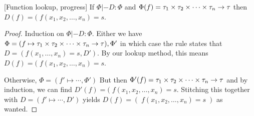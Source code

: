 \documentclass[a4paper, oneside, 10pt, final]{memoir}
\begin{document}
\begin{lem}{[Function lookup, progress]}
  \label{lem:phi-lookup-good}
  If $\Phi |- D : \Phi$ and $\Phi(f) = \tau_1 \times \tau_2 \times \dotsb \times \tau_n -> \tau$ then $D(f) = (\; f(x_1,
  x_2, \dotsc, x_n) = s$.
\end{lem}
\begin{proof}
  Induction on $\Phi |- D : \Phi$. Either we have $\Phi = (f \mapsto
  \tau_1 \times \tau_2 \times \dotsb \times \tau_n -> \tau),\Phi'$ in which case the rule states that $D = (f(x_1,
  \dotsc, x_n) = s, D')$. By our lookup method, this means $D(f) = (\; f(x_1,
  x_2, \dotsc, x_n) = s$.

  Otherwise, $\Phi = (f' \mapsto \dotsb, \Phi')$ But then $\Phi'(f) =
  \tau_1 \times \tau_2 \times \dotsb \times \tau_n -> \tau$ and by induction, we can find $D'(f) = (\; f(x_1,
  x_2, \dotsc, x_n) = s$. Stitching this together with $D = (f'
  \mapsto \dotsb, D')$ yields $D(f) = (\; f(x_1,  x_2, \dotsc, x_n) =
  s \; )$ as wanted.
\end{proof}
\end{document}
